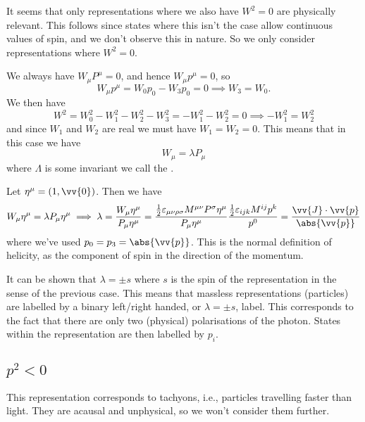 \documentclass[fleqn]{NotesClass}
\begin{document}
    It seems that only representations where we also have \(W^2 = 0\) are physically relevant.
    This follows since states where this isn't the case allow continuous values of spin, and we don't observe this in nature.
    So we only consider representations where \(W^2 = 0\).
    
    We always have \(W_\mu P^\mu = 0\), and hence \(W_\mu p^\mu = 0\), so
    \begin{equation}
        W_\mu p^\mu = W_0 p_0  - W_3p_0 = 0 \implies W_3 = W_0.
    \end{equation}
    We then have
    \begin{equation}
        W^2 = W_0^2 - W_1^2 - W_2^2 - W_3^2 = -W_1^2 - W_2^2 = 0 \implies -W_1^2 = W_2^2
    \end{equation}
    and since \(W_1\) and \(W_2\) are real we must have \(W_1 = W_2 = 0\).
    This means that in this case we have
    \begin{equation}
        W_\mu = \lambda P_\mu
    \end{equation}
    where \(\Lambda\) is some invariant we call the .
    
    Let \(\eta^\mu = (1, \vv{0})\).
    Then we have
    \begin{equation}
        W_\mu \eta^\mu = \lambda P_\mu \eta^\mu \implies \lambda = \frac{W_\mu \eta^\mu}{P_\mu \eta^\mu} = \frac{\frac{1}{2}\varepsilon_{\mu\nu\rho\sigma}M^{\mu\nu}P^\sigma \eta^\mu}{P_\mu \eta^\mu} \frac{\frac{1}{2}\varepsilon_{ijk}M^{ij}p^k}{p^0} = \frac{\vv{J} \cdot \vv{p}}{\abs{\vv{p}}}
    \end{equation}
    where we've used \(p_0 = p_3 = \abs{\vv{p}}\).
    This is the normal definition of helicity, as the component of spin in the direction of the momentum.
    
    It can be shown that \(\lambda = \pm s\) where \(s\) is the spin of the representation in the sense of the previous case.
    This means that massless representations (particles) are labelled by a binary left/right handed, or \(\lambda = \pm s\), label.
    This corresponds to the fact that there are only two (physical) polarisations of the photon.
    States within the representation are then labelled by \(p_i\).
    
    \subsection{\texorpdfstring{\(p^2 < 0\)}{p squared Negative}}
    This representation corresponds to tachyons, i.e., particles travelling faster than light.
    They are acausal and unphysical, so we won't consider them further.
    
    \backmatter
    \printindex
\end{document}
